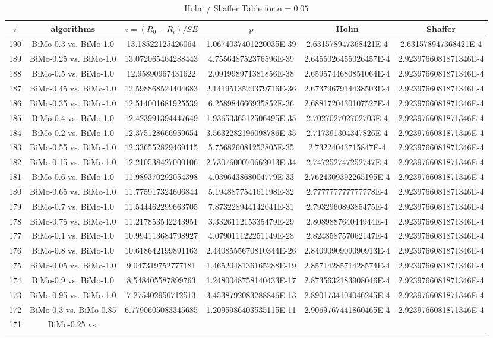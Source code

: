 \documentclass[a4paper,10pt]{article}
\begin{document}
\begin{landscape}
\begin{table}[!htp]
\centering\tiny
\caption{Holm / Shaffer Table for $\alpha=0.05$}
\begin{tabular}{cccccc}
$i$&algorithms&$z=(R_0 - R_i)/SE$&$p$&Holm&Shaffer\\
\hline
190&BiMo-0.3 vs. BiMo-1.0&13.18522125426064&1.0674037401220035E-39&2.631578947368421E-4&2.631578947368421E-4\\189&BiMo-0.25 vs. BiMo-1.0&13.072065464288443&4.755648752376596E-39&2.6455026455026457E-4&2.9239766081871346E-4\\188&BiMo-0.5 vs. BiMo-1.0&12.95890967431622&2.091998971381856E-38&2.6595744680851064E-4&2.9239766081871346E-4\\187&BiMo-0.45 vs. BiMo-1.0&12.598868524404683&2.1419513520379716E-36&2.6737967914438503E-4&2.9239766081871346E-4\\186&BiMo-0.35 vs. BiMo-1.0&12.514001681925539&6.258984666935852E-36&2.6881720430107527E-4&2.9239766081871346E-4\\185&BiMo-0.4 vs. BiMo-1.0&12.423991394447649&1.9365336512506495E-35&2.702702702702703E-4&2.9239766081871346E-4\\184&BiMo-0.2 vs. BiMo-1.0&12.375128666959654&3.5632282196098786E-35&2.717391304347826E-4&2.9239766081871346E-4\\183&BiMo-0.55 vs. BiMo-1.0&12.336552829469115&5.756826081252805E-35&2.73224043715847E-4&2.9239766081871346E-4\\182&BiMo-0.15 vs. BiMo-1.0&12.210538427000106&2.7307600070662013E-34&2.747252747252747E-4&2.9239766081871346E-4\\181&BiMo-0.6 vs. BiMo-1.0&11.989370292054398&4.039643868004779E-33&2.7624309392265195E-4&2.9239766081871346E-4\\180&BiMo-0.65 vs. BiMo-1.0&11.775917324606844&5.194887754161198E-32&2.777777777777778E-4&2.9239766081871346E-4\\179&BiMo-0.7 vs. BiMo-1.0&11.544462299663705&7.873228944142041E-31&2.793296089385475E-4&2.9239766081871346E-4\\178&BiMo-0.75 vs. BiMo-1.0&11.217853542243951&3.332611215335479E-29&2.808988764044944E-4&2.9239766081871346E-4\\177&BiMo-0.1 vs. BiMo-1.0&10.994113684798927&4.079011122251149E-28&2.824858757062147E-4&2.9239766081871346E-4\\176&BiMo-0.8 vs. BiMo-1.0&10.618642199891163&2.4408555670810344E-26&2.8409090909090913E-4&2.9239766081871346E-4\\175&BiMo-0.05 vs. BiMo-1.0&9.047319752777181&1.4652048136165288E-19&2.8571428571428574E-4&2.9239766081871346E-4\\174&BiMo-0.9 vs. BiMo-1.0&8.548405587899763&1.2480048758140433E-17&2.8735632183908046E-4&2.9239766081871346E-4\\173&BiMo-0.95 vs. BiMo-1.0&7.275402950712513&3.4538792083288846E-13&2.8901734104046245E-4&2.9239766081871346E-4\\172&BiMo-0.3 vs. BiMo-0.85&6.7790605083345685&1.2095986403535115E-11&2.9069767441860465E-4&2.9239766081871346E-4\\171&BiMo-0.25 vs. 
\end{tabular}
\end{table}
\end{landscape}
\end{document}
